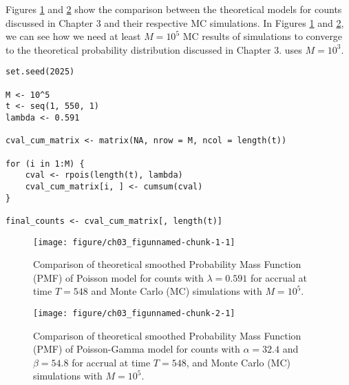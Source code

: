 Figures \ref{fig:3_1} and \ref{fig:3_2} show the comparison between the theoretical models for counts discussed in Chapter 3 and their respective MC simulations. In Figures \ref{fig:3_1} and \ref{fig:3_2}, we can see how we need at least $M=10^5$ MC results of simulations to converge to the theoretical probability distribution discussed in Chapter 3. \cite{carter2004application} uses $M = 10^3$.


\begin{knitrout}
\color{fgcolor}\begin{kframe}
\begin{verbatim}
set.seed(2025)

M <- 10^5
t <- seq(1, 550, 1)
lambda <- 0.591

cval_cum_matrix <- matrix(NA, nrow = M, ncol = length(t))

for (i in 1:M) {
	cval <- rpois(length(t), lambda)
	cval_cum_matrix[i, ] <- cumsum(cval)
}

final_counts <- cval_cum_matrix[, length(t)]
\end{verbatim}
\end{kframe}
\end{knitrout}


\begin{figure}
\begin{knitrout}
\color{fgcolor}
\texttt{[image: figure/ch03\_figunnamed-chunk-1-1]} 
\end{knitrout}
  \caption{Comparison of theoretical smoothed Probability Mass Function (PMF) of Poisson model for counts with $\lambda = 0.591$ for accrual at time $T=548$ and Monte Carlo (MC) simulations with $M=10^5$.}
  \label{fig:3_1}
\end{figure}



\begin{figure}
\begin{knitrout}
\color{fgcolor}
\texttt{[image: figure/ch03\_figunnamed-chunk-2-1]} 
\end{knitrout}
\caption{Comparison of theoretical smoothed Probability Mass Function (PMF) of Poisson-Gamma model for counts with $\alpha = 32.4$ and $\beta = 54.8$ for accrual at time $T=548$, and Monte Carlo (MC) simulations with $M=10^5$.}
\label{fig:3_2}
\end{figure}


